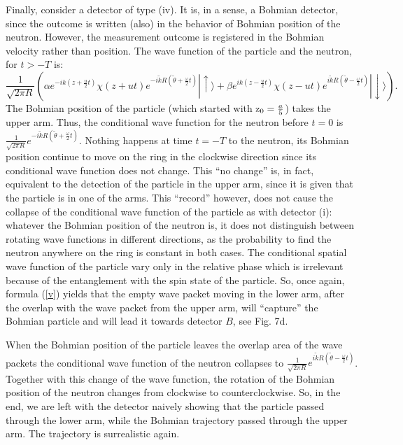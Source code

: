 \documentclass[preprint,tightenlines]{elsarticle}
\begin{document}
Finally, consider a detector of type (iv). It is, in a sense, a Bohmian
detector, since the outcome is written (also) in the behavior of Bohmian
position of the neutron. However, the measurement outcome is registered
in the Bohmian velocity rather than position. The wave function of
the particle and the neutron, for $t>-T$ is:
\begin{equation}
\frac{1}{\sqrt{2\pi R}}\left(\alpha e^{-ik(z+\frac{u}{2}t)}\chi(z+ut)e^{-i\tilde{k}R(\tilde{\theta}+\frac{\omega}{2}t)}|\uparrow\rangle+\beta e^{ik(z-\frac{u}{2}t)}\chi(z-ut)e^{i\tilde{k}R(\tilde{\theta}-\frac{\omega}{2}t)}|\downarrow\rangle\right).\label{psioutnox4}
\end{equation}
 The Bohmian position of the particle (which started with ${\rm z_{0}}=\frac{a}{5}$)
takes the upper arm. Thus, the conditional wave function for the neutron
before $t=0$ is $\frac{1}{\sqrt{2\pi R}}e^{-i\tilde{k}R(\tilde{\theta}+\frac{\omega}{2}t)}$.
Nothing happens at time $t=-T$ to the neutron, its Bohmian position
continue to move on the ring in the clockwise direction since its
conditional wave function does not change. This ``no change''
is, in fact, equivalent to the  detection of the particle in the upper arm, since it is
given that the particle is  in one of the arms. This ``record''
however, does not cause the collapse of the conditional wave function
of the particle as with detector (i): whatever the Bohmian position
of the neutron is, it does not distinguish between rotating wave functions
in different directions, as the probability to find the neutron anywhere
on the ring is constant in both cases. The conditional spatial wave function
of the particle  vary only
in the relative phase which is irrelevant because of the entanglement
with the spin state of the particle. So, once again, formula (\ref{v})
yields that the empty wave packet moving in the lower arm, after the overlap with the wave packet from the upper arm,
will ``capture'' the Bohmian particle and will lead it towards detector $B$, see Fig. 7d.


When the Bohmian position of the particle leaves the overlap area of the wave packets    the conditional wave function of the neutron collapses to
 $\frac{1}{\sqrt{2\pi R}}e^{i\tilde{k}R(\tilde{\theta}-\frac{\omega}{2}t)}$.
Together with this change of the wave function, the rotation of the Bohmian position of the neutron changes from
clockwise to counterclockwise. So, in the end,
we are left with the detector naively showing that the particle passed through the lower arm,
while the Bohmian trajectory passed through the upper arm. The trajectory is surrealistic
again.
\end{document}
